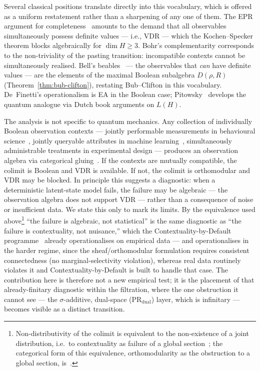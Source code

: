 Several classical positions translate directly into this vocabulary,
which is offered as a uniform restatement rather than a sharpening of
any one of them.
The EPR argument for completeness~\cite{EPR1935} amounts to the
demand that all observables simultaneously possess definite values
--- i.e., VDR --- which the Kochen--Specker theorem blocks
algebraically for $\dim H \geq 3$.  Bohr's
complementarity corresponds to the non-triviality of the pasting
transition: incompatible contexts cannot be simultaneously
realised.
Bell's beables~\cite{HalvorsonClifton1999} --- the observables
that \emph{can} have definite values --- are the elements of the
maximal Boolean subalgebra $D(\rho, R)$
(Theorem~\ref{thm:bub-clifton}), restating Bub--Clifton in this
vocabulary.  De~Finetti's operationalism is
EA in the Boolean case; Pitowsky~\cite{Pitowsky1989} develops the
quantum analogue via Dutch book arguments on $L(H)$.

The analysis is not specific to quantum mechanics.  Any collection
of individually Boolean observation contexts --- jointly performable
measurements in behavioural
science~\cite{DzhafarovKujala2017}, jointly queryable attributes
in machine learning~\cite{DerrWilliamson2023}, simultaneously
administrable treatments in experimental design --- produces an
observation algebra via categorical
gluing~\cite{Gunji2026}.  If the contexts are mutually compatible,
the colimit is Boolean and VDR is available.  If not, the colimit
is orthomodular and VDR may be blocked.  In principle this suggests a
diagnostic: when a deterministic latent-state model fails, the failure
may be algebraic --- the observation algebra does not support VDR ---
rather than a consequence of noise or insufficient data.  We state this
only to mark its limits.  By the equivalence used
above\footnote{Non-distributivity of the colimit is equivalent to the
non-existence of a joint distribution, i.e.\ to contextuality as failure
of a global section~\cite{AbramskyBrandenburger2011, Fine1982}; the
categorical form of this equivalence, orthomodularity as the obstruction
to a global section, is~\cite{Gunji2026}.} ``the
failure is algebraic, not statistical'' is the same diagnostic as ``the
failure is contextuality, not nuisance,'' which the
Contextuality-by-Default programme~\cite{DzhafarovKujala2017,
CervantesDzhafarov2018} already operationalises on empirical data ---
and operationalises in the harder regime, since the sheaf/orthomodular
formulation requires consistent connectedness (no marginal-selectivity
violation), whereas real data routinely violates it and
Contextuality-by-Default is built to handle that case.  The
contribution here is therefore not a new empirical test; it is the
placement of that already-finitary diagnostic within the filtration,
where the one obstruction it cannot see --- the $\sigma$-additive,
dual-space ($\text{PR}_{\text{dual}}$) layer, which is infinitary ---
becomes visible as a distinct transition.

